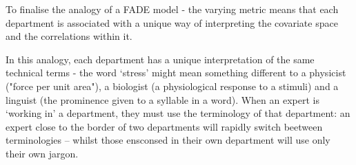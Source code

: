 		\begin{analogy}
			To finalise the analogy of a FADE model - the varying metric means that each department is associated with a unique way of interpreting the covariate space and the correlations within it.

			In this analogy, each department has a unique interpretation of the same technical terms - the word `stress' might mean something different to a physicist ("force per unit area"), a biologist (a physiological response to a stimuli) and a linguist (the prominence given to a syllable in a word). When an expert is `working in' a department, they must use the terminology of that department: an expert close to the border of two departments will rapidly switch beetween terminologies -- whilst those ensconsed in their own department will use only their own jargon.
		\end{analogy}
